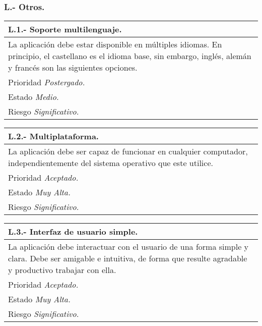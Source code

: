 	\subsubsection{L.- Otros.}

	\begin{center}
	\begin{tabulary}{15cm}{|L|}
		\hline
			\bf{L.1.- Soporte multilenguaje.} \\
		\hline
			La aplicación debe estar disponible en múltiples idiomas. En principio, el castellano es el idioma base, sin embargo, inglés, alemán y francés son las siguientes opciones. \\
		\hline
			Prioridad \textit{Postergado.} \\
		\hline
			Estado \textit{Medio.} \\
		\hline
			Riesgo \textit{Significativo.} \\
		\hline
	\end{tabulary}
	\end{center}

	\begin{center}
	\begin{tabulary}{15cm}{|L|}
		\hline
			\bf{L.2.- Multiplataforma.} \\
		\hline
			La aplicación debe ser capaz de funcionar en cualquier computador, independientemente del sistema operativo que este utilice. \\
		\hline
			Prioridad \textit{Aceptado.} \\
		\hline
			Estado \textit{Muy Alta.} \\
		\hline
			Riesgo \textit{Significativo.} \\
		\hline
	\end{tabulary}
	\end{center}

	\begin{center}
	\begin{tabulary}{15cm}{|L|}
		\hline
			\bf{L.3.- Interfaz de usuario simple.} \\
		\hline
			La aplicación debe interactuar con el usuario de una forma simple y clara. Debe ser amigable e intuitiva, de forma que resulte agradable y productivo trabajar con ella. \\
		\hline
			Prioridad \textit{Aceptado.} \\
		\hline
			Estado \textit{Muy Alta.} \\
		\hline
			Riesgo \textit{Significativo.} \\
		\hline
	\end{tabulary}
	\end{center}

